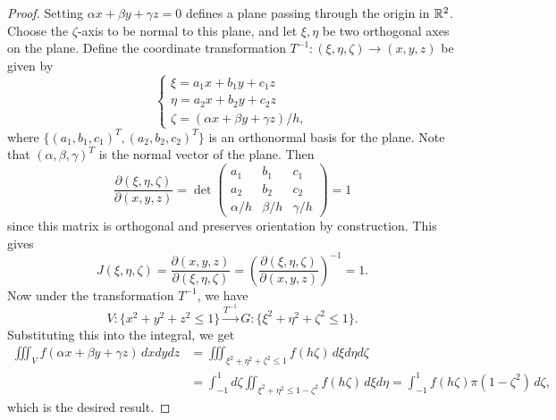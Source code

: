 \begin{proof}
  Setting $\alpha x + \beta y + \gamma z = 0$ defines
  a plane passing through the origin in $\mathbb{R}^2$. Choose
  the $\zeta$-axis to be normal to this plane, and let
  $\xi, \eta$ be two orthogonal axes on the plane. Define
  the coordinate transformation
  $T^{-1} : (\xi, \eta, \zeta) \to (x, y, z)$ be
  given by
  \[
    \begin{cases}
      \xi = a_1 x + b_1 y + c_1 z \\
      \eta = a_2 x + b_2 y + c_2 z \\
      \zeta = (\alpha x + \beta y + \gamma z) / h,
    \end{cases}
  \]
  where $\{(a_1, b_1, c_1)^T, (a_2, b_2, c_2)^T\}$ is an
  orthonormal basis for the plane. Note that $(\alpha, \beta, \gamma)^T$ is the normal vector of the plane.
  Then
  \[
    \frac{\partial(\xi, \eta, \zeta)}{\partial(x, y, z)}
    = \det
    \begin{pmatrix}
      a_1 & b_1 & c_1 \\
      a_2 & b_2 & c_2 \\
      \alpha / h & \beta / h & \gamma / h
    \end{pmatrix} = 1
  \]
  since this matrix is orthogonal and preserves
  orientation by construction. This gives
  \[
    J(\xi, \eta, \zeta) =
    \frac{\partial(x, y, z)}{\partial(\xi, \eta, \zeta)}
    = \left(\frac{\partial(\xi, \eta, \zeta)}{\partial(x, y, z)}\right)^{-1} = 1.
  \]
  Now under the transformation $T^{-1}$, we have
  \[
    V : \{x^2 + y^2 + z^2 \le 1\} \xrightarrow{T^{-1}}
    G : \{\xi^2 + \eta^2 + \zeta^2 \le 1\}.
  \]
  Substituting this into the integral, we get
  \begin{align*}
    \iiint_V f(\alpha x + \beta y + \gamma z)\, dx dy dz
    &= \iiint_{\xi^2 + \eta^2 + \zeta^2 \le 1} f(h \zeta)\, d\xi d\eta d\zeta \\
    &= \int_{-1}^1 d\zeta \iint_{\xi^2 + \eta^2 \le 1 - \zeta^2} f(h \zeta)\, d\xi d\eta
    = \int_{-1}^1 f(h \zeta) \pi (1 - \zeta^2)\, d\zeta,
  \end{align*}
  which is the desired result.
\end{proof}

